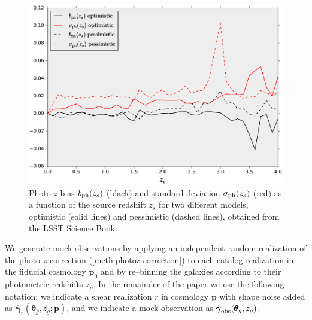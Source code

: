 \documentclass[reprint,aps,prd,superscriptaddress,showkeys,showpacs]{revtex4-1}
\newcommand{\bb}[1]{\mathbf{#1}}
\newcommand{\h}[1]{\hat{#1}}
\begin{document}
\begin{figure}
\includegraphics[scale=0.3]{Figures/scibook.eps}
\caption{Photo-$z$ bias $b_{\rm ph}(z_s)$ (black) and standard deviation $\sigma_{\rm ph}(z_s)$ (red) as a function of the source redshift $z_s$ for two different models, optimistic (solid lines) and pessimistic (dashed lines), obtained from the LSST Science Book \citep{LSSTSciBook}.}
\label{fig:lsstscibook}
\end{figure}

We generate mock observations by applying an independent random realization of the photo-$z$ correction (\ref{meth:photoz-correction}) to each catalog realization in the fiducial cosmology $\bb{p}_0$ and by re--binning the galaxies according to their photometric redshifts $z_p$. In the remainder of the paper we use the following notation: we indicate a shear realization $r$ in cosmology $\bb{p}$ with shape noise added as $\h{\pmb{\gamma}}_r(\pmb{\theta}_g,z_g;\bb{p})$, and we indicate a mock observation as $\h{\pmb{\gamma}}_{\rm obs}(\pmb{\theta}_g,z_g)$.           

\end{document}
